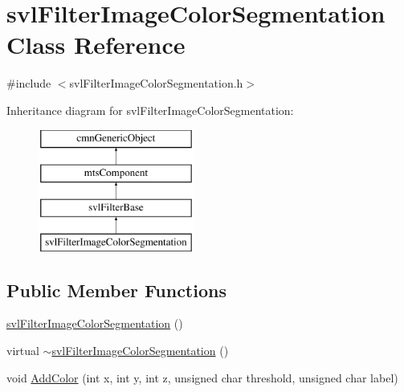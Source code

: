 \hypertarget{classsvl_filter_image_color_segmentation}{\section{svl\-Filter\-Image\-Color\-Segmentation Class Reference}
\label{classsvl_filter_image_color_segmentation}
}


{\ttfamily \#include $<$svl\-Filter\-Image\-Color\-Segmentation.\-h$>$}

Inheritance diagram for svl\-Filter\-Image\-Color\-Segmentation\-:\begin{figure}[H]
\begin{center}
\leavevmode
\includegraphics[height=4.000000cm]{df/da7/classsvl_filter_image_color_segmentation}
\end{center}
\end{figure}
\subsection*{Public Member Functions}
\begin{DoxyCompactItemize}
\item 
\hyperlink{classsvl_filter_image_color_segmentation_a87d109901658f2ea1d71d4d2099573a1}{svl\-Filter\-Image\-Color\-Segmentation} ()
\item 
virtual \hyperlink{classsvl_filter_image_color_segmentation_a22ba4766caf53a58d90adf609e85cbac}{$\sim$svl\-Filter\-Image\-Color\-Segmentation} ()
\item 
void \hyperlink{classsvl_filter_image_color_segmentation_aaeadd40f3ebef72f823cef9f1974e600}{Add\-Color} (int x, int y, int z, unsigned char threshold, unsigned char label)
\end{DoxyCompactItemize}
